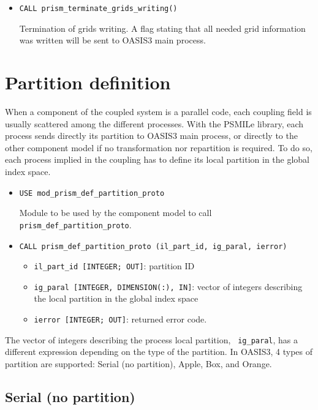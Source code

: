 \begin{itemize}
\item {\tt CALL prism\_terminate\_grids\_writing()}

Termination of grids writing. A flag stating that all needed grid
information was written will be sent to OASIS3 main process.

\end{itemize}

\section{Partition definition}
\label{subsubsec_Partition}

When a component of the coupled system is a parallel code, each
coupling field is usually scattered among the different
processes. With the PSMILe library, each process sends
directly its partition to OASIS3 main process, or directly to the
other component model if no transformation nor repartition is
required.  To do so, each process implied in the coupling has to
define its local partition in the global index space.

\begin{itemize}

\item {\tt USE mod\_prism\_def\_partition\_proto}

Module to be used by the component model to call {\tt
  prism\_def\_partition\_proto}.

\item {\tt CALL prism\_def\_partition\_proto (il\_part\_id,
   ig\_paral, ierror)}
   \begin{itemize}
   \item {\tt il\_part\_id [INTEGER; OUT]}: partition ID 
   \item {\tt ig\_paral [INTEGER, DIMENSION(:), IN]}: vector of
   integers describing the local partition in the global index space
   \item {\tt ierror [INTEGER; OUT]}: returned error code.
   \end{itemize}
\end{itemize} 

The vector of integers describing the process local partition, {\tt
ig\_paral}, has a different expression depending on the type of the
partition. In OASIS3, 4 types of partition are supported: Serial (no
partition), Apple, Box, and Orange.
 
\subsection{Serial (no partition)}

